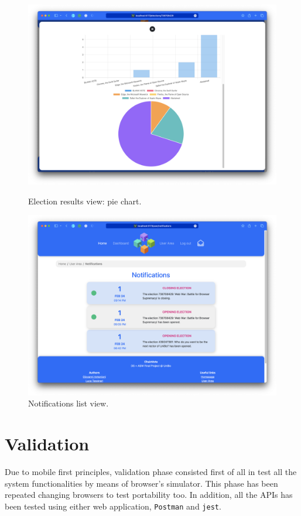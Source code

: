 \documentclass{scrartcl}
\begin{document}
\begin{figure}
    \centering
    \includegraphics[width=0.9\linewidth]{figures/story-board/14-results.png}
    \label{fig:results-2}
    \caption{Election results view: pie chart.}
\end{figure}

\begin{figure}
    \centering
    \includegraphics[width=0.9\linewidth]{figures/story-board/15-notifications.png}
    \caption{Notifications list view.}
    \label{fig:notifications-list}
\end{figure}
\restoregeometry

\section{Validation}

Due to mobile first principles, validation phase consisted first of all in test all the system functionalities by means of browser's simulator.
This phase has been repeated changing browsers to test portability too. In addition, all the APIs has been tested using either web application, \texttt{Postman} and \texttt{jest}.
\end{document}
